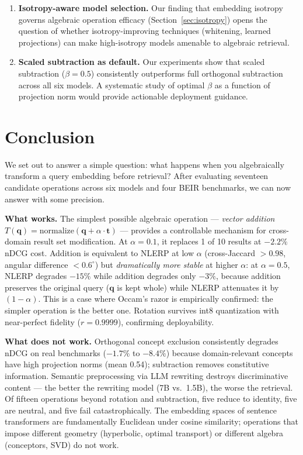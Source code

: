 \documentclass{article}
\begin{document}
\begin{enumerate}
\item \textbf{Isotropy-aware model selection.} Our finding that embedding isotropy governs algebraic operation efficacy (Section~\ref{sec:isotropy}) opens the question of whether isotropy-improving techniques (whitening, learned projections) can make high-isotropy models amenable to algebraic retrieval.

\item \textbf{Scaled subtraction as default.} Our experiments show that scaled subtraction ($\beta = 0.5$) consistently outperforms full orthogonal subtraction across all six models. A systematic study of optimal $\beta$ as a function of projection norm would provide actionable deployment guidance.
\end{enumerate}

\section{Conclusion}

We set out to answer a simple question: what happens when you algebraically transform a query embedding before retrieval? After evaluating seventeen candidate operations across six models and four BEIR benchmarks, we can now answer with some precision.

\textbf{What works.} The simplest possible algebraic operation --- \emph{vector addition} $T(\mathbf{q}) = \text{normalize}(\mathbf{q} + \alpha \cdot \mathbf{t})$ --- provides a controllable mechanism for cross-domain result set modification. At $\alpha = 0.1$, it replaces 1 of 10 results at $-2.2\%$ nDCG cost. Addition is equivalent to NLERP at low $\alpha$ (cross-Jaccard $> 0.98$, angular difference $< 0.6^{\circ}$) but \emph{dramatically more stable} at higher $\alpha$: at $\alpha = 0.5$, NLERP degrades $-15\%$ while addition degrades only $-3\%$, because addition preserves the original query ($\mathbf{q}$ is kept whole) while NLERP attenuates it by $(1-\alpha)$. This is a case where Occam's razor is empirically confirmed: the simpler operation is the better one. Rotation survives int8 quantization with near-perfect fidelity ($r = 0.9999$), confirming deployability.

\textbf{What does not work.} Orthogonal concept exclusion consistently degrades nDCG on real benchmarks ($-1.7\%$ to $-8.4\%$) because domain-relevant concepts have high projection norms (mean 0.54); subtraction removes constitutive information. Semantic preprocessing via LLM rewriting destroys discriminative content --- the better the rewriting model (7B vs.\ 1.5B), the worse the retrieval. Of fifteen operations beyond rotation and subtraction, five reduce to identity, five are neutral, and five fail catastrophically. The embedding spaces of sentence transformers are fundamentally Euclidean under cosine similarity; operations that impose different geometry (hyperbolic, optimal transport) or different algebra (conceptors, SVD) do not work.
\end{document}
